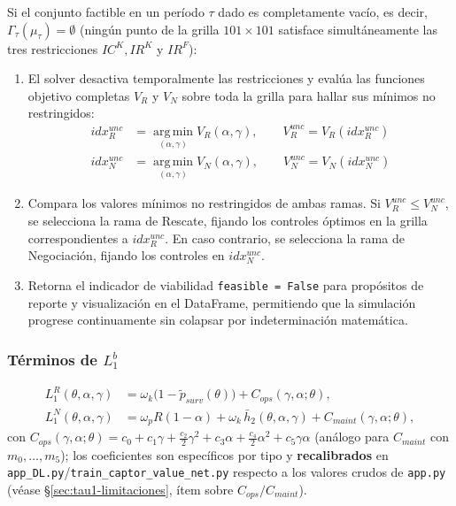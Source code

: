 \documentclass[ecta,nameyear,draft]{econsocart}
\newcommand{\pyfile}[1]{\texttt{#1}}
\newcommand{\pyvar}[1]{\texttt{#1}}
\begin{document}
Si el conjunto factible en un período $\tau$ dado es completamente vacío, es decir, $\Gamma_\tau(\mu_\tau) = \emptyset$ (ningún punto de la grilla $101\times101$ satisface simultáneamente las tres restricciones $IC^K, IR^K$ y $IR^F$):
\begin{enumerate}
    \item El solver desactiva temporalmente las restricciones y evalúa las funciones objetivo completas $V_R$ y $V_N$ sobre toda la grilla para hallar sus mínimos no restringidos:
    \begin{align}
    idx_R^{unc} &= \operatorname*{arg\,min}_{(\alpha,\gamma)} V_R(\alpha,\gamma), \qquad V_R^{unc} = V_R(idx_R^{unc}) \\
    idx_N^{unc} &= \operatorname*{arg\,min}_{(\alpha,\gamma)} V_N(\alpha,\gamma), \qquad V_N^{unc} = V_N(idx_N^{unc})
    \end{align}
    \item Compara los valores mínimos no restringidos de ambas ramas. Si $V_R^{unc} \le V_N^{unc}$, se selecciona la rama de Rescate, fijando los controles óptimos en la grilla correspondientes a $idx_R^{unc}$. En caso contrario, se selecciona la rama de Negociación, fijando los controles en $idx_N^{unc}$.
    \item Retorna el indicador de viabilidad \pyvar{feasible = False} para propósitos de reporte y visualización en el DataFrame, permitiendo que la simulación progrese continuamente sin colapsar por indeterminación matemática.
\end{enumerate}

\subsubsection*{Términos de $L_1^b$}
\begin{align}
L_1^R(\theta,\alpha,\gamma) &= \omega_k\bigl(1-\tilde p_{surv}(\theta)\bigr) + C_{ops}(\gamma,\alpha;\theta), \label{eq:l1r}\\
L_1^N(\theta,\alpha,\gamma) &= \omega_p R(1-\alpha) + \omega_k\,\bar h_2(\theta,\alpha,\gamma) + C_{maint}(\gamma,\alpha;\theta), \label{eq:l1n}
\end{align}
con $C_{ops}(\gamma,\alpha;\theta)=c_0+c_1\gamma+\tfrac{c_2}{2}\gamma^2+c_3\alpha+\tfrac{c_4}{2}\alpha^2+c_5\gamma\alpha$
(análogo para $C_{maint}$ con $m_0,\ldots,m_5$); los coeficientes son específicos por tipo y
\textbf{recalibrados} en \pyfile{app\_DL.py}/\pyfile{train\_captor\_value\_net.py} respecto a
los valores crudos de \pyfile{app.py} (véase \S\ref{sec:tau1-limitaciones}, ítem sobre
$C_{ops}/C_{maint}$).
\end{document}
